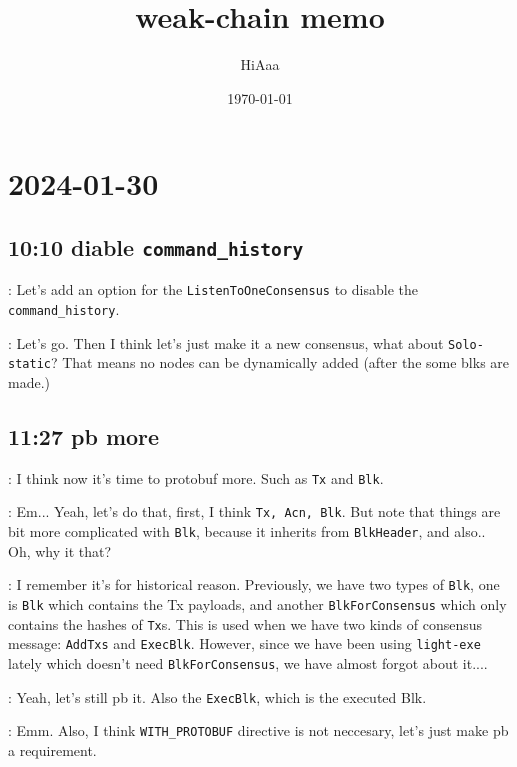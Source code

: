\documentclass[dvipsnames]{article}
\title{weak-chain memo}
\date{\today}
\author{HiAaa}
\begin{document}
\maketitle
\tableofcontents{}
\newpage{}


\section*{2024-01-30}

\subsection*{10:10 diable \texttt{command\_history} \cola{[done at 11:26]}}

 : Let's add an option for the \texttt{ListenToOneConsensus} to
disable the \texttt{command\_history}.

 : Let's go. Then I think let's just make it a new consensus, what
about \texttt{Solo-static}? That means no nodes can be dynamically added (after
the some blks are made.)

\subsection*{11:27 pb more}

 : I think now it's time to protobuf more. Such as \texttt{Tx} and
\texttt{Blk}.

 : Em... Yeah, let's do that, first, I think \texttt{Tx, Acn,
  Blk}. But note that things are bit more complicated with \texttt{Blk}, because
it inherits from \texttt{BlkHeader}, and also.. Oh, why it that?

 : I remember it's for historical reason. Previously, we have two
types of \texttt{Blk}, one is \texttt{Blk} which contains the Tx payloads, and
another \texttt{BlkForConsensus} which only contains the hashes of \texttt{Tx}s.
This is used when we have two kinds of consensus message: \texttt{AddTxs} and
\texttt{ExecBlk}. However, since we have been using \texttt{light-exe} lately
which doesn't need \texttt{BlkForConsensus}, we have almost forgot about it....

 : Yeah, let's still pb it. Also the \texttt{ExecBlk}, which is
the executed Blk.

 : Emm. Also, I think \texttt{WITH\_PROTOBUF} directive is not
neccesary, let's just make pb a requirement.
\end{document}
